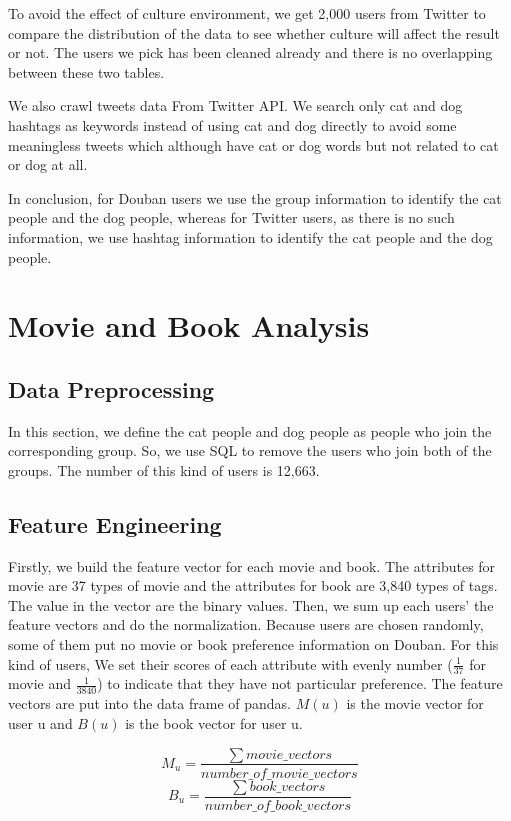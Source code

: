 \documentclass[12pt]{article}
\begin{document}
To avoid the effect of culture environment, we get 2,000 users from Twitter to compare the distribution of the data to see whether culture will affect the result or not. The users we pick has been cleaned already and there is no overlapping between these two tables.

We also crawl tweets data From Twitter API. We search only cat and dog hashtags as keywords instead of using cat and dog directly to avoid some meaningless tweets which although have cat or dog words but not related to cat or dog at all.

In conclusion, for Douban users we use the group information to identify the cat people and the dog people, whereas for Twitter users, as there is no such information, we use hashtag information to identify the cat people and the dog people.

\section{Movie and Book Analysis}

\subsection{Data Preprocessing}

In this section, we define the cat people and dog people as people who join the corresponding group. So, we use SQL to remove the users who join both of the groups. The number of this kind of users is 12,663.

\subsection{Feature Engineering}

Firstly, we build the feature vector for each movie and book. The attributes for movie are 37 types of movie and the attributes for book are 3,840 types of tags. The value in the vector are the binary values. Then, we sum up each users' the feature vectors and do the normalization. Because users are chosen randomly, some of them put no movie or book preference information on Douban. For this kind of users, We set their scores of each attribute with evenly number ($\frac{1}{37}$ for movie and $\frac{1}{3840}$) to indicate that they have not particular preference. The feature vectors are put into the data frame of pandas. $M(u)$ is the movie vector for user u and $B(u)$ is the book vector for user u.

$$M_u = \frac{\sum movie\_vectors}{number\_of\_movie\_vectors}$$
$$B_u = \frac{\sum book\_vectors}{number\_of\_book\_vectors}$$
\end{document}
